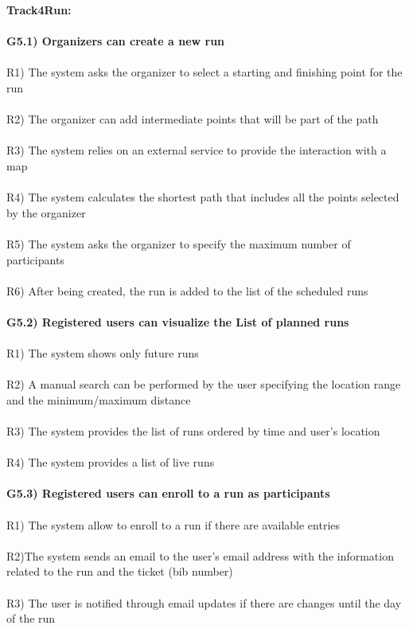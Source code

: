\textbf{Track4Run:}\\ \\
\textbf{G5.1) Organizers can create a new run} \\ \\
R1) The system asks the organizer to select a starting and finishing point for the run \\ \\
R2) The organizer can add intermediate points that will be part of the path \\ \\
R3) The system relies on an external service to provide the interaction with a map \\ \\
R4) The system calculates the shortest path that includes all the points selected by the organizer \\ \\   
R5) The system asks the organizer to specify the maximum number of participants \\ \\
R6) After being created, the run is added to the list of the scheduled runs \\ \\
\textbf{G5.2) Registered users can visualize the List of planned runs} \\ \\
R1) The system shows only future runs \\ \\ 
R2) A manual search can be performed by the user specifying the location range and the minimum/maximum distance \\ \\ 
R3) The system provides the list of runs ordered by time and user’s location \\ \\
R4) The system provides a list of live runs \\ \\
\textbf{G5.3) Registered users can enroll to a run as participants} \\ \\
R1) The system allow to enroll to a run if there are available entries \\ \\
R2)The system sends an email to the user’s email address with the information related to the run and the ticket (bib number) \\ \\
R3) The user is notified through email updates if there are changes until the day of the run \\ \\
